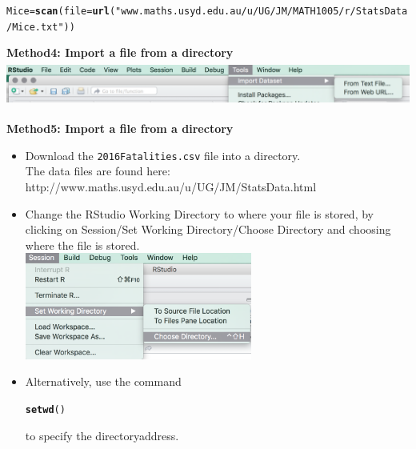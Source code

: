 \documentclass[bigtut]{tutorial}\usepackage[]{graphicx}\usepackage[]{color}
\makeatletter
\newcommand{\hlstr}[1]{\textcolor[rgb]{0.192,0.494,0.8}{#1}}%
\newcommand{\hlstd}[1]{\textcolor[rgb]{0.345,0.345,0.345}{#1}}%
\newcommand{\hlkwb}[1]{\textcolor[rgb]{0.69,0.353,0.396}{#1}}%
\newcommand{\hlkwc}[1]{\textcolor[rgb]{0.333,0.667,0.333}{#1}}%
\newcommand{\hlkwd}[1]{\textcolor[rgb]{0.737,0.353,0.396}{\textbf{#1}}}%
\newenvironment{kframe}{%
 \def\at@end@of@kframe{}%
 \ifinner\ifhmode%
  \def\at@end@of@kframe{\end{minipage}}%
  \begin{minipage}{\columnwidth}%
 \fi\fi%
 \def\FrameCommand##1{\hskip\@totalleftmargin \hskip-\fboxsep
 \colorbox{shadecolor}{##1}\hskip-\fboxsep
     \hskip-\linewidth \hskip-\@totalleftmargin \hskip\columnwidth}%
 \MakeFramed {\advance\hsize-\width
   \@totalleftmargin\z@ \linewidth\hsize
   \@setminipage}}%
 {\par\unskip\endMakeFramed%
 \at@end@of@kframe}
\newenvironment{knitrout}{}{} %
\makeatother
\begin{document}
\begin{tutorial}
\begin{questions}
\begin{itemize}
\begin{knitrout}
\color{fgcolor}\begin{kframe}
\begin{alltt}
\hlstd{Mice}\hlkwb{=}\hlkwd{scan}\hlstd{(}\hlkwc{file}\hlstd{=}\hlkwd{url}\hlstd{(}\hlstr{"www.maths.usyd.edu.au/u/UG/JM/MATH1005/r/StatsData/Mice.txt"}\hlstd{))}
\end{alltt}
\end{kframe}
\end{knitrout}

\end{itemize}

\newpage

{\bf Method4: Import a file from a directory} \\

\includegraphics[height=1.5cm]{ImportData.jpg}


\vspace{1cm}
{\bf Method5: Import a file from a directory}

\begin{itemize}

\item
Download the {\tt 2016Fatalities.csv} file into a directory. \\
The data files are found here: 
http://www.maths.usyd.edu.au/u/UG/JM/StatsData.html \\

\item
Change the RStudio Working Directory to where your file is stored, by clicking on \textsf{Session/Set Working Directory/Choose Directory} and choosing where the file is stored. \\

\includegraphics[height=3.5cm]{Setwd.jpg} \\

\item
Alternatively, use the command 
\begin{knitrout}
\color{fgcolor}\begin{kframe}
\begin{alltt}
\hlkwd{setwd}\hlstd{()}
\end{alltt}
\end{kframe}
\end{knitrout}
to specify the directoryaddress. \\


\end{itemize}
\end{questions}
\end{tutorial}
\end{document}
